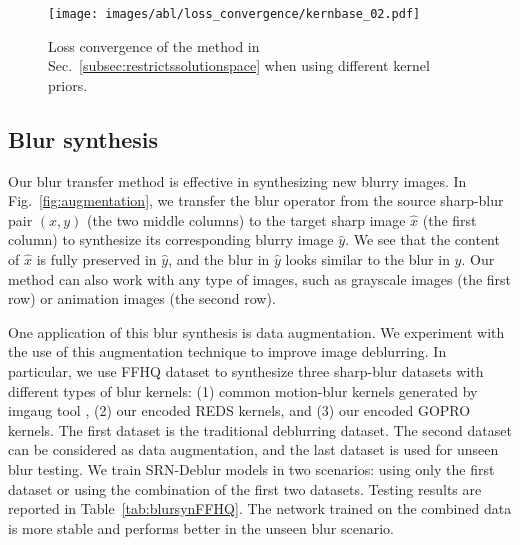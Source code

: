 \documentclass[final]{cvpr}
\newcommand{\Sref}[1]{Sec.~\ref{#1}}
\newcommand{\Fref}[1]{Fig.~\ref{#1}}
\newcommand{\Tref}[1]{Table~\ref{#1}}
\newcommand{\anh}[1]{{\textcolor{cyan}{[Anh: #1]}}}
\begin{document}
\begin{figure}[ht]
    \begin{center}
        \texttt{[image: images/abl/loss\_convergence/kernbase\_02.pdf]}
        \caption{Loss convergence of the method in \Sref{subsec:restrictssolutionspace} when using different kernel priors.}
        \label{fig:loss_convergence}
    \end{center}
    \vspace{-5mm}
\end{figure}






\subsection{Blur synthesis}
Our blur transfer method is effective in synthesizing new blurry images. In \Fref{fig:augmentation}, we transfer the blur operator from the source sharp-blur pair $(x, y)$ (the two middle columns) to the target sharp image $\hat{x}$ (the first column) to synthesize its corresponding blurry image $\hat{y}$. We see that the content of $\hat{x}$ is fully preserved in $\hat{y}$, and the blur in $\hat{y}$ looks similar to the blur in $y$. Our method can also work with any type of images, such as grayscale images (the first row) or animation images (the second row). %

One application of this blur synthesis is data augmentation. We experiment with the use of this augmentation technique to improve image deblurring. In particular, we use FFHQ dataset \cite{karras2019style} to synthesize three sharp-blur datasets with different types of blur kernels: (1) common motion-blur kernels generated by imgaug tool \cite{imgaug}, (2) our encoded REDS kernels, and (3) our encoded GOPRO kernels. The first dataset is the traditional deblurring dataset. The second dataset can be considered as data augmentation, and the last dataset is used for unseen blur testing. We train SRN-Deblur models \cite{tao2018scale} in two scenarios: using only the first dataset or using the combination of the first two datasets. Testing results are reported in \Tref{tab:blursynFFHQ}. The network trained on the combined data is more stable and performs better in the unseen blur scenario.
\end{document}
